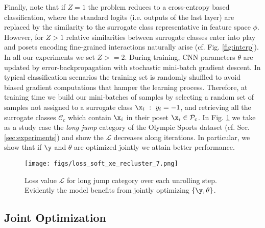 \documentclass[10pt,twocolumn,letterpaper]{article}
\begin{document}
Finally, note that if $Z=1$ the problem reduces to a cross-entropy based classification, where the standard logits (i.e. outputs of the last layer) are replaced by the similarity to the surrogate class representative in feature space $\phi$. However, for $Z>1$ relative similarities between surrogate classes enter into play and posets encoding fine-grained interactions naturally arise (cf. Fig. \ref{fig:interp}). In all our experiments we set $Z>=2$. During training, CNN parameters $\theta$ are updated by error-backpropagation with stochastic mini-batch gradient descent. In typical classification scenarios the training set is randomly shuffled to avoid biased gradient computations that hamper the learning process. Therefore, at training time we build our mini-batches of samples by selecting a random set of samples not assigned to a surrogate class $\x_i~:~y_i=-1$, and retrieving all the surrogate classes $\mathcal{C}_c$ which contain $\x_i$ in their poset $\x_i \in \mathcal{P}_c$. In Fig. \ref{fig:loss_reclustering} we take as a study case the \textit{long jump} category of the Olympic Sports dataset (cf. Sec. \ref{sec:experiments}) and show the $\mathcal{L}$ decreases along iterations. In particular, we show that if $\y$ and $\theta$ are optimized jointly we attain better performance.
 
 \begin{figure}
\texttt{[image: figs/loss\_soft\_xe\_recluster\_7.png]}
\caption{Loss value $\mathcal{L}$ for long jump category over each unrolling step. Evidently the model benefits from jointly optimizing $\{\y, \theta\}$.}
\label{fig:loss_reclustering}
\end{figure}



\subsection{Joint Optimization}\label{sec:recurrent}
\end{document}
